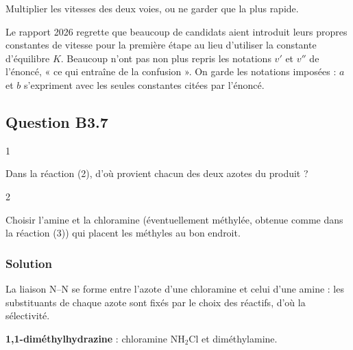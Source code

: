 \documentclass[11pt,a4paper]{article}
\newcommand{\equationajustee}[1]{%
  \sbox{\boiteequation}{$\displaystyle #1$}%
  \ifdim\wd\boiteequation>\linewidth
    \[\resizebox{\linewidth}{!}{\usebox{\boiteequation}}\]%
  \else
    \[#1\]%
  \fi}
\begin{document}
\begin{piege}

Multiplier les vitesses des deux voies, ou ne garder que la plus rapide.

\end{piege}

\begin{jury}

Le rapport 2026 regrette que beaucoup de candidats aient introduit leurs propres constantes de vitesse pour la première étape au lieu d'utiliser la constante d'équilibre \(K\). Beaucoup n'ont pas non plus repris les notations \(v'\) et \(v''\) de l'énoncé, « ce qui entraîne de la confusion ». On garde les notations imposées : \(a\) et \(b\) s'expriment avec les seules constantes citées par l'énoncé.

\end{jury}

\hypertarget{question-b3.7}{%
\subsection{Question B3.7}\label{question-b3.7}}

\begin{indication}{1}

Dans la réaction (2), d'où provient chacun des deux azotes du produit ?

\end{indication}

\begin{indication}{2}

Choisir l'amine et la chloramine (éventuellement méthylée, obtenue comme dans la réaction (3)) qui placent les méthyles au bon endroit.

\end{indication}

\hypertarget{solution-41}{%
\subsubsection{Solution}\label{solution-41}}

La liaison N--N se forme entre l'azote d'une chloramine et celui d'une amine : les substituants de chaque azote sont fixés par le choix des réactifs, d'où la sélectivité.

\textbf{1,1-diméthylhydrazine} : chloramine \(\mathrm{NH_2Cl}\) et diméthylamine.

\equationajustee{\mathrm{ClO^- + NH_3 = NH_2Cl + HO^-}}
\end{document}
